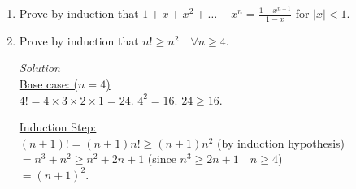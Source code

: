 \documentclass[12pt]{article}
\newif\ifsln
\newcommand{\R}{\mathbb{R}}
\newcommand{\Z}{\mathbb{Z}}
\newcommand{\Q}{\mathbb{Q}}
\newcommand{\halmos}{\hfill$\blacksquare$}
\begin{document}
\begin{enumerate}[1.]
\ifsln
\textit{Solution}\\
Let $a\in \Q$ be a rational number and $b \in \R \backslash \Q$ be an irrational number. Assume $a + b$ is rational. Then $a + b = \frac{p}{q}$ with $p,q \in \Z$ relatively prime. Since $a$ is rational, $a$ can be represented as $\frac{r}{s}$, with $r, s \in \Z$ relatively prime. \\

$b = \frac{p}{q} - \frac{r}{s} = \frac{ps - qr}{qs}$. $ps - qr \in \Z$ and $qs \in \Z$ since integers are closed under addition and multiplication. Therefore $b$ is rational. Contradiction.\\

\halmos
\fi



\item Prove by induction that $1 + x + x^{2} + \dots + x^{n} = \frac{1 - x^{n+1}}{1 - x}$ for $|x|< 1$.

\ifsln
\textit{Solution}\\
\underline{Base case: ($n = 0$)}\\
 Sum of first 0 powers of x is 1. $\frac{1 - x^{0 + 1}}{1 - x} = 1$.\smallskip

\underline{Induction Step:}\\
$1 + x + \dots + x^{n} + x^{n+1} = \frac{1 - x^{n+1}}{1 - x} + x^{n+1}$ (by induction hypothesis)\\
$= \frac{1 - x^{n+1}}{1 - x} + \frac{x^{n+1}(1-x)}{1 - x}= \frac{1 - x^{n+1}}{1 - x} + \frac{x^{n+1}-x^{n+2}}{1 - x} = \frac{1 - x^{n+1} + x^{n+1} - x^{n+2} }{1 - x} = \frac{1-x^{(n+1) + 1}}{1-x}$\halmos
\fi

\item Prove by induction that $n! \geq n^{2} \quad \forall n\geq 4$.

\ifsln
\textit{Solution}\\
\underline{Base case: ($n = 4$)}\\
$4! = 4\times 3\times 2\times 1 = 24$. $4^{2} = 16$. $24 \geq 16$.\smallskip

\underline{Induction Step:}\\
$(n+1)! = (n+1)n! \geq (n+1)n^{2}$ (by induction hypothesis)\\
$= n^{3} + n^{2} \geq n^{2} + 2n + 1$ (since $n^3 \geq 2n + 1 \quad n\geq 4$)\\
$= (n+1)^{2}$.\\


\end{enumerate}
\end{document}
